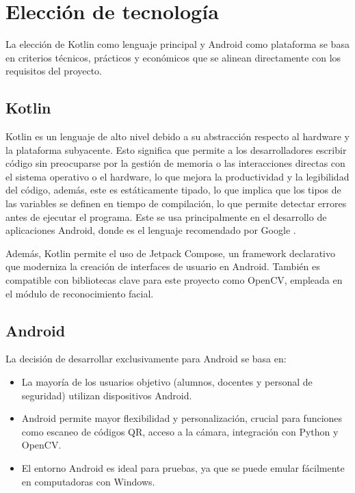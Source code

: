 

\section{Elección de tecnología}
La elección de Kotlin como lenguaje principal y Android como plataforma se basa en criterios técnicos, prácticos y económicos que se alinean directamente con los requisitos del proyecto.
\subsection{Kotlin}
Kotlin es un lenguaje de alto nivel debido a su abstracción respecto al hardware y la plataforma subyacente. Esto significa que permite a los desarrolladores escribir código sin preocuparse por la gestión de memoria o las interacciones directas con el sistema operativo o el hardware, lo que mejora la productividad y la legibilidad del código, además, este es estáticamente tipado, lo que implica que los tipos de las variables se definen en tiempo de compilación, lo que permite detectar errores antes de ejecutar el programa. Este se usa principalmente en el desarrollo de aplicaciones Android, donde es el lenguaje recomendado por Google \cite{CitaD14}.

Además, Kotlin permite el uso de Jetpack Compose, un framework declarativo que moderniza la creación de interfaces de usuario en Android. También es compatible con bibliotecas clave para este proyecto como OpenCV, empleada en el módulo de reconocimiento facial.

\subsection{Android}
La decisión de desarrollar exclusivamente para Android se basa en:

\begin{itemize}
	\item La mayoría de los usuarios objetivo (alumnos, docentes y personal de seguridad) utilizan dispositivos Android.
	
	\item Android permite mayor flexibilidad y personalización, crucial para funciones como escaneo de códigos QR, acceso a la cámara, integración con Python y OpenCV.
	
	\item El entorno Android es ideal para pruebas, ya que se puede emular fácilmente en computadoras con Windows.
\end{itemize}

